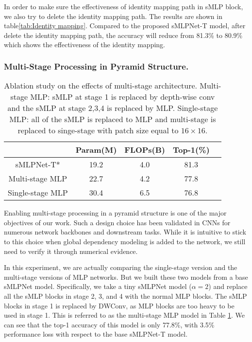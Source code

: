 \documentclass[letterpaper]{article} \usepackage{aaai22}  \usepackage{times}  \usepackage{helvet}  \usepackage{courier}  \usepackage[hyphens]{url}  \usepackage{graphicx} \usepackage{color}
\begin{document}
In order to make sure the effectiveness of identity mapping path in sMLP block, we also try to delete the identity mapping path. The results are shown in table\ref{tab:Identity mapping}. Compared to the proposed sMLPNet-T model, after delete the identity mapping path, the accuracy will reduce from 81.3\% to 80.9\% which shows the effectiveness of the identity mapping.
\fi


\subsubsection{Multi-Stage Processing in Pyramid Structure.}
\begin{table}[t]
\centering
\begin{tabular}{c|c c c c}
    \hline
    & Param(M) & FLOPs(B) & Top-1(\%) \\
    \hline
    sMLPNet-T*    &19.2 &4.0 &81.3  \\
    Multi-stage MLP     &22.7 &4.2 &77.8  \\
    Single-stage MLP    &30.4 &6.5 &76.8  \\
    \hline
\end{tabular}
\caption{Ablation study on the effects of multi-stage architecture. Multi-stage MLP: sMLP at stage 1 is replaced by depth-wise conv and the sMLP at stage 2,3,4 is replaced by MLP. Single-stage MLP: all of the sMLP is replaced to MLP and multi-stage is replaced to singe-stage with patch size equal to $16\times16$.}
\label{tab:multi-stage}
\end{table}

Enabling multi-stage processing in a pyramid structure is one of the major objectives of our work. Such a design choice has been validated in CNNs for numerous network backbones and downstream tasks. While it is intuitive to stick to this choice when global dependency modeling is added to the network, we still need to verify it through numerical evidence. 

In this experiment, we are actually comparing the single-stage version and the multi-stage versions of MLP networks. But we built these two models from a base sMLPNet model. Specifically, we take a tiny sMLPNet model ($\alpha=2$) and replace all the sMLP blocks in stage 2, 3, and 4 with the normal MLP blocks. The sMLP blocks in stage 1 is replaced by DWConv, as MLP blocks are too heavy to be used in stage 1. This is referred to as the multi-stage MLP model in Table \ref{tab:multi-stage}. We can see that the top-1 accuracy of this model is only 77.8\%, with 3.5\% performance loss with respect to the base sMLPNet-T model. 
\end{document}
